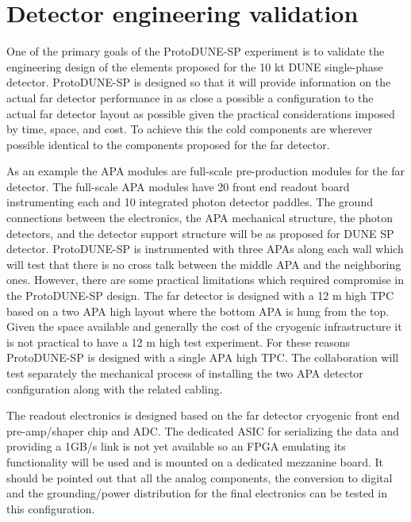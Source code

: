 \section{Detector engineering validation}  %

One of the primary goals of the ProtoDUNE-SP experiment is to validate the engineering design of the elements proposed for the 10 kt DUNE single-phase detector. ProtoDUNE-SP is designed so that it will provide information on the actual far detector performance in as close a possible a configuration to the actual far detector layout as possible given the practical considerations imposed by time, space, and cost. To achieve this the cold components are wherever possible identical to the components proposed for the far detector. 

As an example the APA modules are full-scale pre-production modules for the far detector. The full-scale APA modules have 20 front end readout board instrumenting each and 10 integrated photon detector paddles. The ground connections between the electronics, the APA mechanical structure, the photon detectors, and the detector support structure will be as proposed for DUNE SP detector. ProtoDUNE-SP is instrumented with three APAs along each wall which will test that there is no cross talk between the middle APA and the neighboring ones. However, there are some practical limitations which required compromise in the ProtoDUNE-SP design. The far detector is designed with a 12 m high TPC based on a two APA high layout where the bottom APA is hung from the top. Given the space available and generally the cost of the cryogenic infrastructure it is not practical to have a 12 m high test experiment. For these reasons ProtoDUNE-SP is designed with a single APA high TPC. The collaboration will test separately the mechanical process of installing the two APA detector configuration along with the related cabling.

The readout electronics is designed based on the far detector cryogenic front end pre-amp/shaper chip and ADC.  The dedicated ASIC for serializing the data and providing a 1GB/s link is not yet available so an FPGA emulating its functionality will be used and is mounted on a dedicated mezzanine board. It should be pointed out that all the analog components, the conversion to digital and the grounding/power distribution for the final electronics can be tested in this configuration. 

